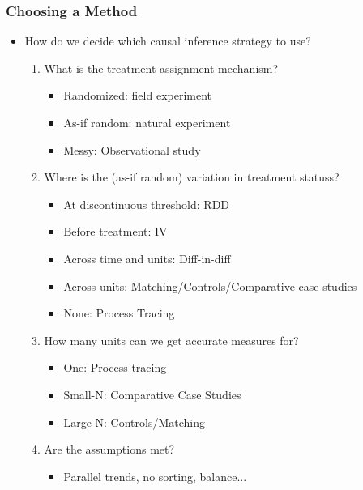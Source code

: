 \documentclass[xcolor=x11names,compress]{beamer}\usepackage[]{graphicx}\usepackage[]{color}
\renewcommand{\(}{\begin{columns}}
\renewcommand{\)}{\end{columns}}
\newcommand{\<}[1]{\begin{column}{#1}}
\renewcommand{\>}{\end{column}}
\begin{document}
\begin{frame}
\frametitle{Choosing a Method}
\begin{itemize}
\item How do we decide which causal inference strategy to use?
\pause
\begin{enumerate}
\item What is the treatment assignment mechanism?
\pause
\begin{itemize}
\item Randomized: field experiment
\item As-if random: natural experiment
\item Messy: Observational study
\pause
\end{itemize}
\item Where is the (as-if random) variation in treatment statuss?
\pause
\begin{itemize}
\item At discontinuous threshold: RDD
\item Before treatment: IV 
\item Across time and units: Diff-in-diff
\item Across units: Matching/Controls/Comparative case studies
\item None: Process Tracing
\end{itemize}
\pause
\item How many units can we get accurate measures for?
\pause
\begin{itemize}
\item One: Process tracing
\item Small-N: Comparative Case Studies
\item Large-N: Controls/Matching
\end{itemize}
\pause
\item Are the assumptions met?
\pause
\begin{itemize}
\item Parallel trends, no sorting, balance...
\end{itemize}
\end{enumerate}
\end{itemize}
\end{frame}
\end{document}

